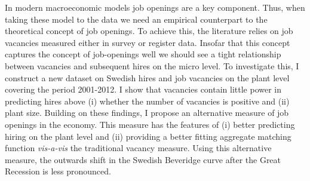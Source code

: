 In modern macroeconomic models job openings are a key component. Thus, when taking these model to the data we need an empirical counterpart to the theoretical concept of job openings. To achieve this, the literature relies on job vacancies measured either in survey or register data. Insofar that this concept captures the concept of job-openings well we should see a tight relationship between vacancies and subsequent hires on the micro level. To investigate this, I construct a new dataset on Swedish hires and job vacancies on the plant level covering the period 2001-2012. I show that vacancies contain little power in predicting hires above (i) whether the number of vacancies is positive and (ii) plant size. Building on these findings, I propose an alternative measure of job openings in the economy. This measure has the features of (i) better predicting hiring on the plant level and (ii) providing a better fitting aggregate matching function \emph{vis-a-vis} the traditional vacancy measure. Using this alternative measure, the outwards shift in the Swedish Beveridge curve after the Great Recession is less pronounced.

